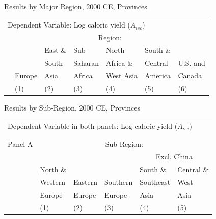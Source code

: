 \documentclass[10pt, xcolor=dvipsnames]{beamer}
\begin{document}
\begin{frame}{Results by Major Region, 2000 CE, Provinces}\label{regprov}

{\scriptsize
\begin{tabularx}{\textwidth}{lXXXXXX}
\midrule
\multicolumn{7}{l}{Dependent Variable: Log caloric yield ($A_{isc}$)} \\
 & \multicolumn{6}{c}{Region:} \\ \cmidrule{2-7}
 &        & East \& & Sub-        & North     & South \&  &  \\
 &        & South   & Saharan     & Africa \& & Central   & U.S. and \\
 & Europe & Asia    & Africa      & West Asia & America   & Canada \\
 & (1) & (2) & (3) & (4) & (5) & (6) \\
\midrule

\midrule
\end{tabularx}
}

\hfill \hyperlink{robustness}{}
\end{frame}

\begin{frame}{Results by Sub-Region, 2000 CE, Provinces}

{\scriptsize
\begin{tabularx}{\textwidth}{lXXXXX}
\midrule
\multicolumn{6}{l}{Dependent Variable in both panels: Log caloric yield ($A_{isc}$)} \\ \\
\\
Panel A & \multicolumn{5}{c}{Sub-Region:} \\ \cmidrule{2-6}
 &          &         &             &  \multicolumn{2}{c}{Excl. China} \\ \cmidrule(lr){5-6}
 & North \& &         &              & South \&  & Central \&             \\
 & Western  & Eastern & Southern     & Southeast & West        \\
 & Europe   & Europe  & Europe       & Asia      & Asia      \\
 & (1) & (2) & (3) & (4) & (5) \\
\midrule

\midrule
\end{tabularx}
}

\hfill \hyperlink{robustness}{}
\end{frame}
\end{document}
